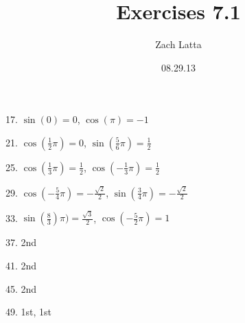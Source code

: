 \documentclass[12pt]{article}
\title{Exercises 7.1}
\author{Zach Latta}
\date{08.29.13}
\begin{document}
\maketitle

17. $\sin (0) = 0$, $\cos (\pi) = -1$

21. $\cos (\frac{1}{2}\pi) = 0$, $\sin (\frac{5}{6}\pi) = \frac{1}{2}$

25. $\cos (\frac{1}{3}\pi) = \frac{1}{2}$, $\cos (-\frac{1}{3}\pi) = \frac{1}{2}$

29. $\cos (-\frac{5}{4}\pi) = -\frac{\sqrt{2}}{2}$, $\sin (\frac{3}{4}\pi) = -\frac{\sqrt{2}}{2}$

33. $\sin (\frac{8}{3})\pi) = \frac{\sqrt{3}}{2}$, $\cos (-\frac{5}{2}\pi) = 1$

37. 2nd

41. 2nd

45. 2nd

49. 1st, 1st
\end{document}
